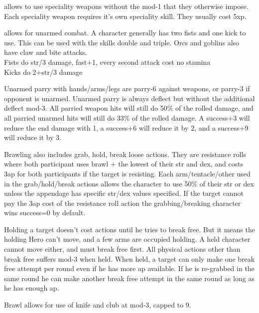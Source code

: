  allows to use speciality weapons without the mod-1 that they otherwise impose. Each speciality weapon requires it's own speciality skill. They usually cost 5xp.


 allows for unarmed combat. A character generally has two fists and one kick to use. This can be used with the skills double and triple. Orcs and goblins also have claw and bite attacks.\\
Fists do str/3 damage, fast+1, every second attack cost no stamina \\
Kicks do 2+str/3 damage

Unarmed parry with hands/arms/legs are parry-6 against weapons, or parry-3 if opponent is unarmed. Unarmed parry is always deflect but without the additional deflect mod-3. All parried weapon hits will still do 50\% of the rolled damage, and all parried unarmed hits will still do 33\% of the rolled damage. A success+3 will reduce the end damage with 1, a success+6 will reduce it by 2, and a success+9 will reduce it by 3.

Brawling also includes grab, hold, break loose actions. They are resistance rolls where both participant uses brawl + the lowest of their str and dex, and costs 3ap for both participants if the target is resisting.     %
Each arm/tentacle/other used in the grab/hold/break actions allows the character to use 50\% of their str or dex unless the appendage has specific str/dex values specified.
If the target cannot pay the 3ap cost of the resistance roll action the grabbing/breaking character wins success=0 by default.

Holding a target doesn't cost actions until he tries to break free. But it means the holding Hero can't move, and a few arms are occupied holding. A held character cannot move either, and must break free first. All physical actions other than break free suffers mod-3 when held.
When held, a target can only make one break free attempt per round even if he has more ap available. If he is re-grabbed in the same round he can make another break free attempt in the same round as long as he has enough ap.

Brawl allows for use of knife and club at mod-3, capped to 9.


